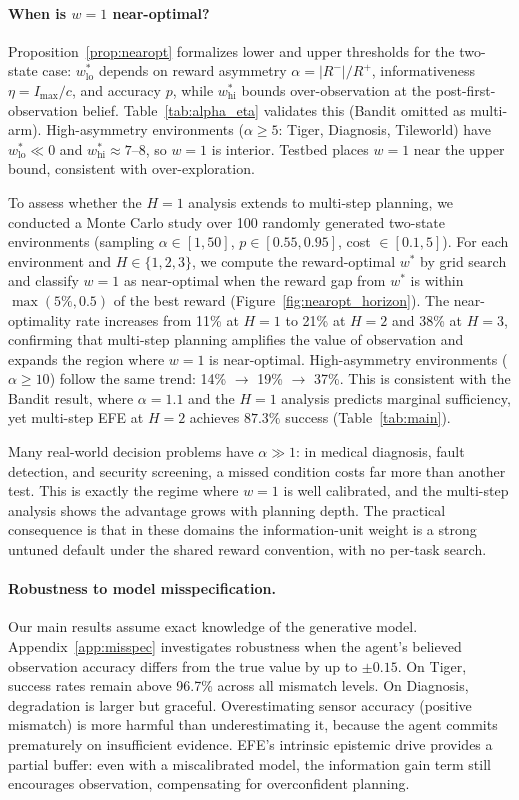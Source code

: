 \documentclass[runningheads]{llncs}
\begin{document}
\paragraph{When is $w{=}1$ near-optimal?}
Proposition~\ref{prop:nearopt} formalizes lower and upper thresholds for the two-state case: $w^*_{\mathrm{lo}}$ depends on reward asymmetry $\alpha = |R^-|/R^+$, informativeness $\eta = I_{\max}/c$, and accuracy $p$, while $w^*_{\mathrm{hi}}$ bounds over-observation at the post-first-observation belief. Table~\ref{tab:alpha_eta} validates this (Bandit omitted as multi-arm). High-asymmetry environments ($\alpha \geq 5$: Tiger, Diagnosis, Tileworld) have $w^*_{\mathrm{lo}} \ll 0$ and $w^*_{\mathrm{hi}} \approx 7$--$8$, so $w{=}1$ is interior. Testbed places $w{=}1$ near the upper bound, consistent with over-exploration.

To assess whether the $H{=}1$ analysis extends to multi-step planning, we conducted a Monte Carlo study over 100 randomly generated two-state environments (sampling $\alpha \in [1, 50]$, $p \in [0.55, 0.95]$, cost $\in [0.1, 5]$). For each environment and $H \in \{1, 2, 3\}$, we compute the reward-optimal $w^*$ by grid search and classify $w{=}1$ as near-optimal when the reward gap from $w^*$ is within $\max(5\%, 0.5)$ of the best reward (Figure~\ref{fig:nearopt_horizon}). The near-optimality rate increases from 11\% at $H{=}1$ to 21\% at $H{=}2$ and 38\% at $H{=}3$, confirming that multi-step planning amplifies the value of observation and expands the region where $w{=}1$ is near-optimal. High-asymmetry environments ($\alpha \geq 10$) follow the same trend: 14\% $\to$ 19\% $\to$ 37\%. This is consistent with the Bandit result, where $\alpha{=}1.1$ and the $H{=}1$ analysis predicts marginal sufficiency, yet multi-step EFE at $H{=}2$ achieves $87.3\%$ success (Table~\ref{tab:main}).

Many real-world decision problems have $\alpha \gg 1$: in medical diagnosis, fault detection, and security screening, a missed condition costs far more than another test. This is exactly the regime where $w{=}1$ is well calibrated, and the multi-step analysis shows the advantage grows with planning depth. The practical consequence is that in these domains the information-unit weight is a strong untuned default under the shared reward convention, with no per-task search.

\paragraph{Robustness to model misspecification.}
Our main results assume exact knowledge of the generative model. Appendix~\ref{app:misspec} investigates robustness when the agent's believed observation accuracy differs from the true value by up to $\pm 0.15$. On Tiger, success rates remain above 96.7\% across all mismatch levels. On Diagnosis, degradation is larger but graceful. Overestimating sensor accuracy (positive mismatch) is more harmful than underestimating it, because the agent commits prematurely on insufficient evidence. EFE's intrinsic epistemic drive provides a partial buffer: even with a miscalibrated model, the information gain term still encourages observation, compensating for overconfident planning.
\end{document}
